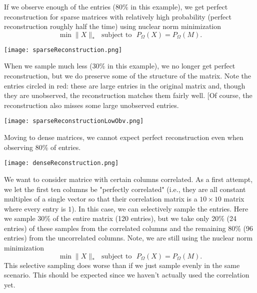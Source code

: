 \documentclass[12pt]{article}
\begin{document}
If we observe enough of the entries (80\% in this example), we get perfect reconstruction for sparse matrices with relatively high probability (perfect reconstruction roughly half the time) using nuclear norm minimization $$\min \| X \|_* \,\,\,\, \text{subject to} \,\,\,\, P_\Omega(X) = P_{\Omega}(M).$$ 

\begin{center}
\texttt{[image: sparseReconstruction.png]}\\
\end{center}

\noindent\makebox[\linewidth]{\rule{\textwidth}{2pt}}

When we sample much less (30\% in this example), we no longer get perfect reconstruction, but we do preserve some of the structure of the matrix. Note the entries circled in red: these are large entries in the original matrix and, though they are unobserved, the reconstruction matches them fairly well. [Of course, the reconstruction also misses some large unobserved entries.
  
\begin{center}
\texttt{[image: sparseReconstructionLowObv.png]}\\
\end{center}  
  
  
\noindent\makebox[\linewidth]{\rule{\textwidth}{2pt}}  

Moving to dense matrices, we cannot expect perfect reconstruction even when observing 80\% of entries.
  
\begin{center}
\texttt{[image: denseReconstruction.png]}\\
\end{center}  
  
\noindent\makebox[\linewidth]{\rule{\textwidth}{2pt}}  

We want to consider matrice with certain columns correlated. As a first attempt, we let the first ten columns be "perfectly correlated" (i.e., they are all constant multiples of a single vector so that their correlation matrix is a $10\times 10$ matrix where every entry is $1$). In this case, we can selectively sample the entries. Here we sample 30\% of the entire matrix (120 entries), but we take only 20\% (24 entries) of these samples from the correlated columns and the remaining 80\% (96 entries) from the uncorrelated columns. Note, we are still using the nuclear norm minimization $$\min \| X \|_* \,\,\,\, \text{subject to} \,\,\,\, P_\Omega(X) = P_{\Omega}(M).$$ This selective sampling does worse than if we just sample evenly in the same scenario. This should be expected since we haven't actually used the correlation yet.
  
\end{document}

